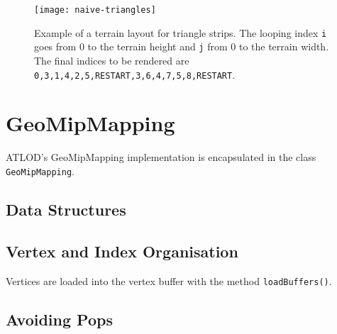 \begin{figure}[H]
  \centering
  \texttt{[image: naive-triangles]}
  \caption{Example of a terrain layout for triangle strips. The looping index \texttt{i} goes from 0 to the terrain height and \texttt{j} from 0 to the terrain width. The final indices to be rendered are \texttt{0,3,1,4,2,5,RESTART,3,6,4,7,5,8,RESTART}.}\label{fig:naive-triangles}
\end{figure}

\section{GeoMipMapping}
ATLOD's GeoMipMapping implementation is encapsulated in the class \texttt{GeoMipMapping}.

\subsection{Data Structures}

\subsection{Vertex and Index Organisation}
Vertices are loaded into the vertex buffer with the method \texttt{loadBuffers()}.

\subsection{Avoiding Pops}

